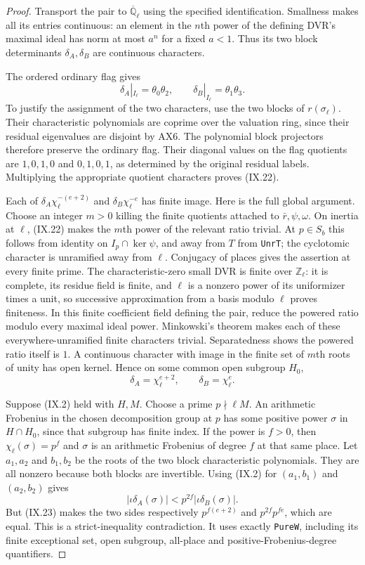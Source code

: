 \begin{proof}
Transport the pair to $\overline{\mathbb Q}_\ell$ using
the specified identification.  Smallness makes all its
entries continuous: an element in the $n$th power of
the defining DVR's maximal ideal has norm at most
$a^n$ for a fixed $a<1$.  Thus its two block determinants
$\delta_A,\delta_B$ are continuous characters.

The ordered ordinary flag gives
\[
 \delta_A|_{I_\ell}=\theta_0\theta_2,
                  \qquad
 \delta_B|_{I_\ell}=\theta_1\theta_3.
 \tag{IX.22}
\]
To justify the assignment of the two characters, use the
two blocks of $r(\sigma_\ell)$.  Their characteristic
polynomials are coprime over the valuation ring, since
their residual eigenvalues are disjoint by AX6.
The polynomial block projectors therefore preserve the
ordinary flag.  Their diagonal values on the flag
quotients are $1,0,1,0$ and $0,1,0,1$, as determined
by the original residual labels.  Multiplying the
appropriate quotient characters proves (IX.22).

Each of $\delta_A\chi_\ell^{-(e+2)}$ and
$\delta_B\chi_\ell^{-e}$ has finite image.
Here is the full global argument.  Choose an integer
$m>0$ killing the finite quotients attached to
$\bar r,\psi,\omega$.  On inertia at $\ell$, (IX.22)
makes the $m$th power of the relevant ratio trivial.
At $p\in S_b$ this follows from identity on
$I_p\cap\ker\psi$, and away from $T$ from
\texttt{UnrT}; the cyclotomic character is unramified
away from $\ell$.
Conjugacy of places gives the assertion at every finite
prime.  The characteristic-zero small DVR is finite
over $\mathbb Z_\ell$: it is complete, its residue field
is finite, and $\ell$ is a nonzero power of its
uniformizer times a unit, so successive approximation
from a basis modulo $\ell$ proves finiteness.
In this finite coefficient field defining the
pair, reduce the powered ratio modulo every maximal
ideal power.  Minkowski's theorem makes each of these
everywhere-unramified finite characters trivial.
Separatedness shows the powered ratio itself is $1$.
A continuous character with image in the finite set of
$m$th roots of unity has open kernel.
Hence on some common open subgroup $H_0$,
\[
                       \delta_A=\chi_\ell^{e+2},
                       \qquad \delta_B=\chi_\ell^e.
 \tag{IX.23}
\]

Suppose (IX.2) held with $H,M$.  Choose a prime
$p\nmid \ell M$.  An arithmetic Frobenius in the
chosen decomposition group at $p$ has some positive
power $\sigma$ in $H\cap H_0$, since that subgroup
has finite index.  If the power is $f>0$, then
$\chi_\ell(\sigma)=p^f$ and $\sigma$ is an arithmetic
Frobenius of degree $f$ at that same place.
Let $a_1,a_2$ and $b_1,b_2$ be the roots of the two
block characteristic polynomials.  They are all
nonzero because both blocks are invertible.
Using (IX.2) for $(a_1,b_1)$ and $(a_2,b_2)$ gives
\[
 |\iota\delta_A(\sigma)|
                   <p^{2f}|\iota\delta_B(\sigma)|.
 \tag{IX.24}
\]
But (IX.23) makes the two sides respectively
$p^{f(e+2)}$ and $p^{2f}p^{fe}$, which are equal.
This is a strict-inequality contradiction.
It uses exactly \texttt{PureW}, including its finite
exceptional set, open subgroup, all-place and
positive-Frobenius-degree quantifiers.
\end{proof}
